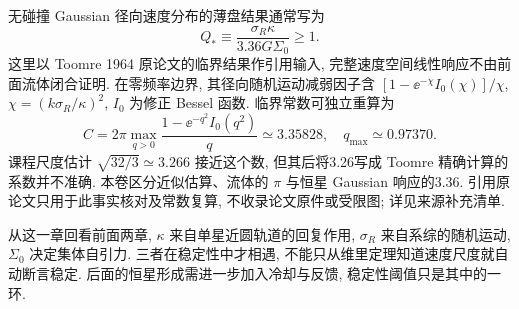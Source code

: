 无碰撞 Gaussian 径向速度分布的薄盘结果通常写为
\[
Q_*\equiv\frac{\sigma_R\kappa}{3.36G\Sigma_0}\ge1.
\]
这里以 Toomre 1964 原论文的临界结果作引用输入, 完整速度空间线性响应不由前面流体闭合证明. 在零频率边界, 其径向随机运动减弱因子含 $[1-\ee^{-\chi}I_0(\chi)]/\chi$, $\chi=(k\sigma_R/\kappa)^2$, $I_0$ 为修正 Bessel 函数. 临界常数可独立重算为
\[
C=2\pi\max_{q>0}\frac{1-\ee^{-q^2}I_0(q^2)}q
\simeq3.35828,
\quad q_{\max}\simeq0.97370.
\]
课程尺度估计 $\sqrt{32/3}\simeq3.266$ 接近这个数, 但其后将3.26写成 Toomre 精确计算的系数并不准确. 本卷区分近似估算、流体的 $\pi$ 与恒星 Gaussian 响应的3.36. 引用原论文只用于此事实核对及常数复算, 不收录论文原件或受限图; 详见来源补充清单.

从这一章回看前面两章, $\kappa$ 来自单星近圆轨道的回复作用, $\sigma_R$ 来自系综的随机运动, $\Sigma_0$ 决定集体自引力. 三者在稳定性中才相遇, 不能只从维里定理知道速度尺度就自动断言稳定. 后面的恒星形成需进一步加入冷却与反馈, 稳定性阈值只是其中的一环.
